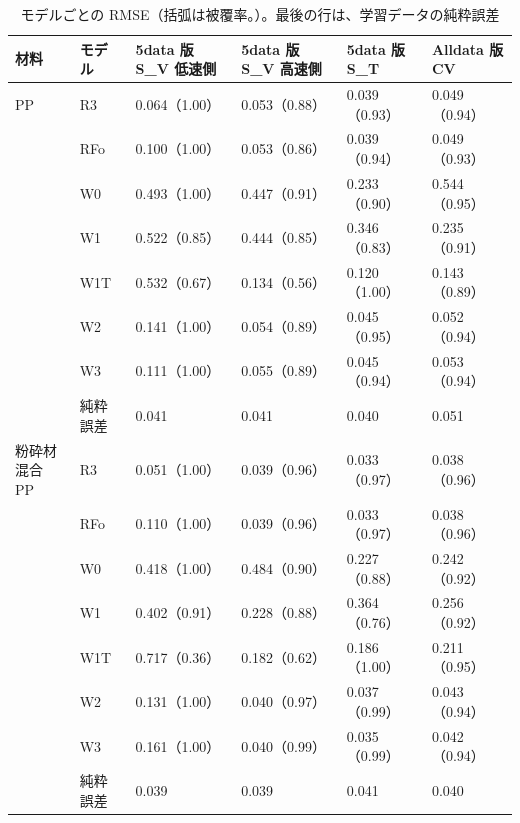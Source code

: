 \documentclass[paper=a4paper,fontsize=10.5pt,line_length=44zw,number_of_lines=38]{jlreq}
\newcommand{\file}[1]{\texttt{\detokenize{#1}}}
\begin{document}
\begin{table}[H]
\caption{モデルごとの RMSE（括弧は被覆率。\file{metrics.csv}）。最後の行は、学習データの純粋誤差}\label{tab:met}
\begin{tabularx}{\linewidth}{@{}l>{\raggedright\arraybackslash}p{4\zw}XXXX@{}}
\toprule
材料 & モデル & 5data 版 S\_V 低速側 & 5data 版 S\_V 高速側 & 5data 版 S\_T & Alldata 版 CV \\
\midrule
PP & R3 & 0.064（1.00） & 0.053（0.88） & 0.039（0.93） & 0.049（0.94） \\
 & RFo & 0.100（1.00） & 0.053（0.86） & 0.039（0.94） & 0.049（0.93） \\
 & W0 & 0.493（1.00） & 0.447（0.91） & 0.233（0.90） & 0.544（0.95） \\
 & W1 & 0.522（0.85） & 0.444（0.85） & 0.346（0.83） & 0.235（0.91） \\
 & W1T & 0.532（0.67） & 0.134（0.56） & 0.120（1.00） & 0.143（0.89） \\
 & W2 & 0.141（1.00） & 0.054（0.89） & 0.045（0.95） & 0.052（0.94） \\
 & W3 & 0.111（1.00） & 0.055（0.89） & 0.045（0.94） & 0.053（0.94） \\
 & 純粋誤差 & 0.041 & 0.041 & 0.040 & 0.051 \\
粉砕材混合 PP & R3 & 0.051（1.00） & 0.039（0.96） & 0.033（0.97） & 0.038（0.96） \\
 & RFo & 0.110（1.00） & 0.039（0.96） & 0.033（0.97） & 0.038（0.96） \\
 & W0 & 0.418（1.00） & 0.484（0.90） & 0.227（0.88） & 0.242（0.92） \\
 & W1 & 0.402（0.91） & 0.228（0.88） & 0.364（0.76） & 0.256（0.92） \\
 & W1T & 0.717（0.36） & 0.182（0.62） & 0.186（1.00） & 0.211（0.95） \\
 & W2 & 0.131（1.00） & 0.040（0.97） & 0.037（0.99） & 0.043（0.94） \\
 & W3 & 0.161（1.00） & 0.040（0.99） & 0.035（0.99） & 0.042（0.94） \\
 & 純粋誤差 & 0.039 & 0.039 & 0.041 & 0.040 \\
\bottomrule
\end{tabularx}
\end{table}
\end{document}

